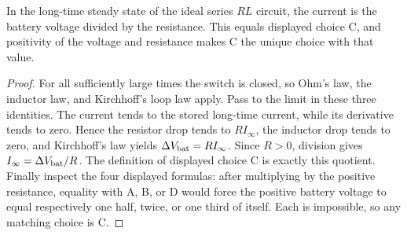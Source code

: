 \begin{theorem}
\label{thm:physics:phyx_mini_0882:target}
In the long-time steady state of the ideal series \(RL\) circuit, the current
is the battery voltage divided by the resistance.  This equals displayed
choice C, and positivity of the voltage and resistance makes C the unique
choice with that value.
\end{theorem}
\begin{proof}
For all sufficiently large times the switch is closed, so Ohm's law, the
inductor law, and Kirchhoff's loop law apply.  Pass to the limit in these
three identities.  The current tends to the stored long-time current, while
its derivative tends to zero.  Hence the resistor drop tends to
\(R I_\infty\), the inductor drop tends to zero, and Kirchhoff's law yields
\(\Delta V_{\rm bat}=R I_\infty\).  Since \(R>0\), division gives
\(I_\infty=\Delta V_{\rm bat}/R\).  The definition of displayed choice C is
exactly this quotient.  Finally inspect the four displayed formulas: after
multiplying by the positive resistance, equality with A, B, or D would force
the positive battery voltage to equal respectively one half, twice, or one
third of itself.  Each is impossible, so any matching choice is C.
\end{proof}

